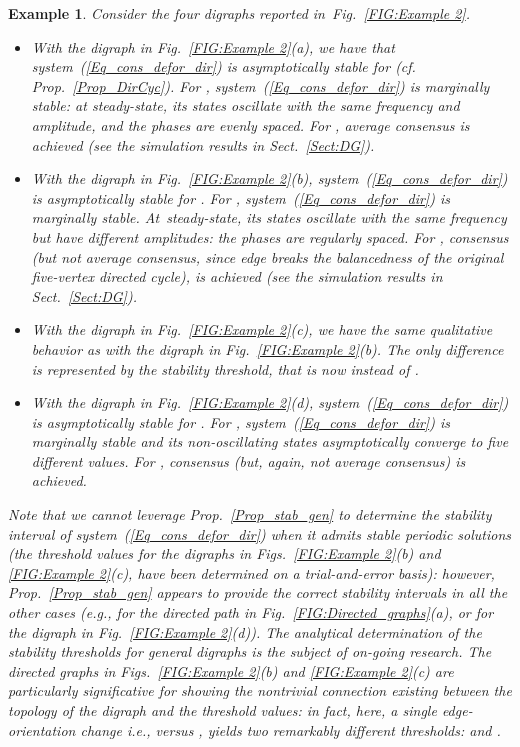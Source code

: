 \documentclass[letterpaper,9pt,twocolumn]{autart}
\newtheorem{example}{\textbf{Example}}
\begin{document}
\begin{example}\label{Example2}
Consider the four digraphs reported in~Fig.~\ref{FIG:Example 2}.
\begin{itemize}
\item With the digraph in Fig.~\ref{FIG:Example 2}(a), we have that
system~(\ref{Eq_cons_defor_dir}) is asymptotically stable for  (cf. Prop.~\ref{Prop_DirCyc}). For , system~(\ref{Eq_cons_defor_dir}) is marginally
stable: at steady-state, its states oscillate with the same frequency and amplitude, and the phases are evenly spaced.
For , average consensus is achieved (see the simulation results
in Sect.~\ref{Sect:DG}). 
\item With the digraph in Fig.~\ref{FIG:Example 2}(b),
system~(\ref{Eq_cons_defor_dir}) is asymptotically stable for . For , system~(\ref{Eq_cons_defor_dir}) is
marginally stable. At~steady-state, its states oscillate with the same
frequency but have different amplitudes: the phases are regularly
spaced. For \mbox{}, consensus (but not average consensus, since edge
 breaks the balancedness of the original \mbox{five-vertex} directed
cycle), is achieved (see the simulation results in Sect.~\ref{Sect:DG}).
\item With the digraph in Fig.~\ref{FIG:Example 2}(c), we have the 
same qualitative behavior as with the digraph in 
Fig.~\ref{FIG:Example 2}(b). The only difference is represented by the stability threshold, that is now
 instead of .
\item With the digraph in Fig.~\ref{FIG:Example 2}(d),
system~(\ref{Eq_cons_defor_dir}) is asymptotically stable for . For , system~(\ref{Eq_cons_defor_dir}) is 
marginally stable and its \emph{non-oscillating} states asymptotically
converge to five different values. For , consensus (but, again, not average \mbox{consensus}) is achieved.
\end{itemize}
Note that we cannot leverage Prop.~\ref{Prop_stab_gen} to determine the stability interval 
of system~(\ref{Eq_cons_defor_dir}) when it admits stable periodic 
solutions (the threshold values for the digraphs in Figs.~\ref{FIG:Example 2}(b) and 
\ref{FIG:Example 2}(c), have been determined on a trial-and-error basis): however, Prop.~\ref{Prop_stab_gen} appears to provide the
correct stability intervals in all the other cases (e.g., for the
directed path in Fig.~\ref{FIG:Directed_graphs}(a), or for the digraph in 
Fig.~\ref{FIG:Example 2}(d)). 
The analytical determination of the stability
thresholds for general digraphs is the subject of \mbox{on-going} research. The directed graphs in Figs.~\ref{FIG:Example 2}(b) and \ref{FIG:Example 2}(c)
are particularly significative for showing the nontrivial connection
existing between the topology of the digraph  and 
the threshold values: in fact, here, a single edge-orientation change 
i.e.,  versus , yields two remarkably different
thresholds:  and .~\hfill
\end{example}
\end{document}
